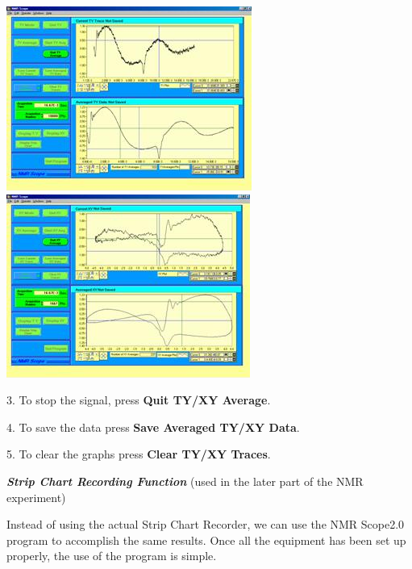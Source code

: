 \documentclass{../lab}
\begin{document}
\noindent
\href{http://experimentationlab.berkeley.edu/sites/default/files/images/NMR38.jpg}{\includegraphics[width=0.33\linewidth,keepaspectratio]{images/NMR38.jpg}}
\href{http://experimentationlab.berkeley.edu/sites/default/files/images/NMR39.jpg}{\includegraphics[width=0.33\linewidth,keepaspectratio]{images/NMR39.jpg}}

3. To stop the signal, press \textbf{Quit TY/XY Average}.

4. To save the data press \textbf{Save Averaged TY/XY Data}.

5. To clear the graphs press \textbf{Clear TY/XY Traces}.

\emph{\textbf{Strip Chart Recording Function}} (used in the later part of the NMR experiment)

Instead of using the actual Strip Chart Recorder, we can use the NMR Scope2.0 program to accomplish the same results. Once all the equipment has been set up properly, the use of the program is simple.
\end{document}
